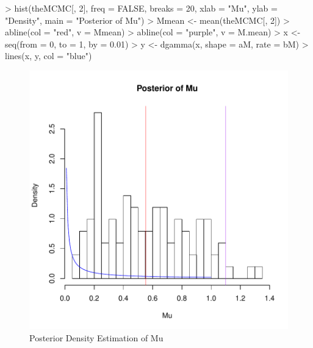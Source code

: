 \documentclass[12pt]{article}
\begin{document}
\begin{Schunk}
\begin{Sinput}
> hist(theMCMC[, 2], freq = FALSE, breaks = 20, xlab = "Mu", ylab = "Density", 
     main = "Posterior of Mu")
> Mmean <- mean(theMCMC[, 2])
> abline(col = "red", v = Mmean)
> abline(col = "purple", v = M.mean)
> x <- seq(from = 0, to = 1, by = 0.01)
> y <- dgamma(x, shape = aM, rate = bM)
> lines(x, y, col = "blue")
\end{Sinput}
\end{Schunk}
\begin{figure}
  \begin{center}
\includegraphics{BD_MCMC-muPlot}
\end{center}
\caption{Posterior Density Estimation of Mu}
\label{fig:muPosterior}
\end{figure}




\end{document}

